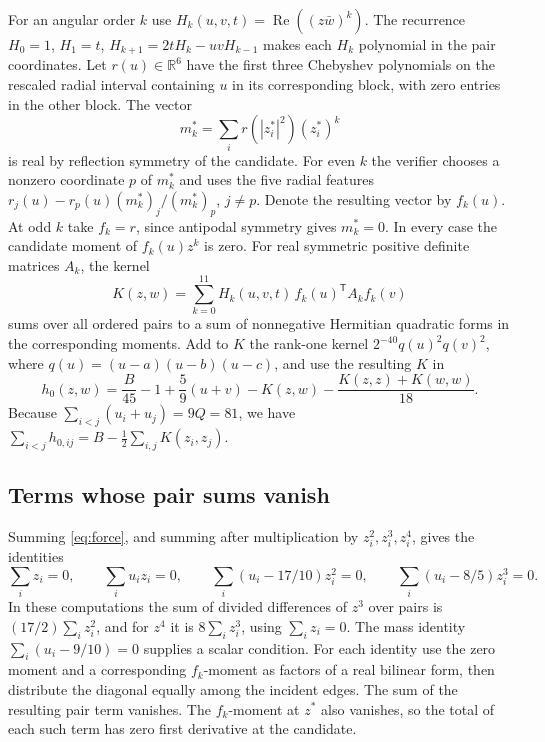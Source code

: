 \documentclass[11pt]{article}
\newcommand{\real}{\operatorname{Re}}
\begin{document}
For an angular order \(k\) use
\(H_k(u,v,t)=\real((z\bar w)^k)\). The recurrence
\(H_0=1\), \(H_1=t\), \(H_{k+1}=2tH_k-uvH_{k-1}\) makes each
\(H_k\) polynomial in the pair coordinates. Let \(r(u)\in\mathbb R^6\)
have the first three Chebyshev polynomials on the rescaled radial
interval containing \(u\) in its corresponding block, with zero
entries in the other block. The vector
\[
 m_k^*=\sum_i r(|z_i^*|^2)(z_i^*)^k
\]
is real by reflection symmetry of the candidate. For even \(k\) the
verifier chooses a nonzero coordinate \(p\) of \(m_k^*\) and uses
the five radial features
\(r_j(u)-r_p(u)(m_k^*)_j/(m_k^*)_p\), \(j\ne p\). Denote the resulting
vector by \(f_k(u)\). At odd \(k\) take \(f_k=r\), since antipodal
symmetry gives \(m_k^*=0\). In every case the candidate moment of
\(f_k(u)z^k\) is zero. For real symmetric positive definite matrices
\(A_k\), the kernel
\[
 K(z,w)=\sum_{k=0}^{11}H_k(u,v,t)\, f_k(u)^{\mathsf T}A_k f_k(v)
\]
sums over all ordered pairs to a sum of nonnegative Hermitian
quadratic forms in the corresponding moments. Add to \(K\) the
rank-one kernel \(2^{-40}q(u)^2q(v)^2\), where
\(q(u)=(u-a)(u-b)(u-c)\), and use the resulting \(K\) in
\begin{equation}
 h_0(z,w)=\frac{B}{45}-1+\frac59(u+v)-K(z,w)
                   -\frac{K(z,z)+K(w,w)}{18}.                 \label{eq:h0}
\end{equation}
Because \(\sum_{i<j}(u_i+u_j)=9Q=81\), we have
\(\sum_{i<j}h_{0,ij}=B-\tfrac12\sum_{i,j}K(z_i,z_j)\).

\subsection{Terms whose pair sums vanish}

Summing \eqref{eq:force}, and summing after multiplication by
\(z_i^2,z_i^3,z_i^4\), gives the identities
\begin{equation}
 \sum_i z_i=0,\qquad \sum_i u_i z_i=0,\qquad
 \sum_i (u_i-17/10)z_i^2=0,\qquad
 \sum_i (u_i-8/5)z_i^3=0.                                    \label{eq:ward}
\end{equation}
In these computations the sum of divided differences of \(z^3\)
over pairs is \((17/2)\sum_i z_i^2\), and for \(z^4\) it is
\(8\sum_i z_i^3\), using \(\sum_i z_i=0\). The mass identity
\(\sum_i(u_i-9/10)=0\) supplies a scalar condition.
For each identity use the zero moment and a corresponding
\(f_k\)-moment as factors of a real bilinear form, then distribute
the diagonal equally among the incident edges. The sum of the resulting
pair term vanishes. The \(f_k\)-moment at \(z^*\) also vanishes, so
the total of each such term has zero first derivative at the candidate.
\end{document}
